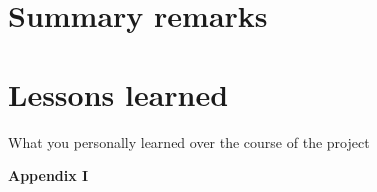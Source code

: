 \documentclass[11pt,a4paper]{article}
\begin{document}
\newpage

\section{Summary remarks}

\newpage

\section{Lessons learned}

What you personally learned over the course of the project

%
%

\newpage

\noindent\Large{\textbf{Appendix I}}
\end{document}
